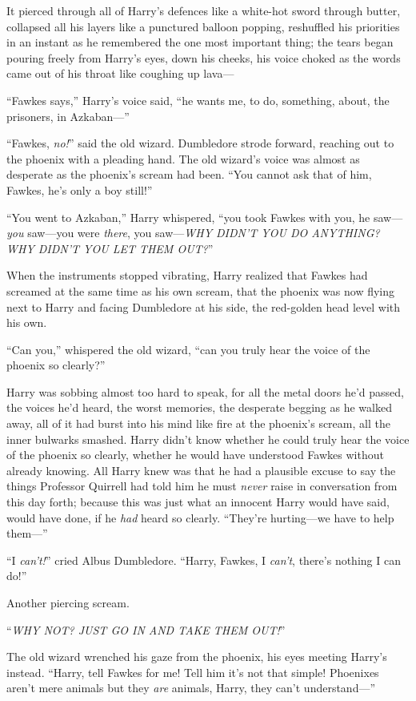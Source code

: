 It pierced through all of Harry’s defences like a white-hot sword through butter, collapsed all his layers like a punctured balloon popping, reshuffled his priorities in an instant as he remembered the one most important thing; the tears began pouring freely from Harry’s eyes, down his cheeks, his voice choked as the words came out of his throat like coughing up lava—

“Fawkes says,” Harry’s voice said, “he wants me, to do, something, about, the prisoners, in Azkaban—”

“Fawkes, \emph{no!}” said the old wizard. Dumbledore strode forward, reaching out to the phoenix with a pleading hand. The old wizard’s voice was almost as desperate as the phoenix’s scream had been. “You cannot ask that of him, Fawkes, he’s only a boy still!”

“You went to Azkaban,” Harry whispered, “you took Fawkes with you, he saw—\emph{you} saw—you were \emph{there}, you saw—\emph{WHY DIDN’T YOU DO ANYTHING? WHY DIDN’T YOU LET THEM OUT?}”

When the instruments stopped vibrating, Harry realized that Fawkes had screamed at the same time as his own scream, that the phoenix was now flying next to Harry and facing Dumbledore at his side, the red-golden head level with his own.

“Can you,” whispered the old wizard, “can you truly hear the voice of the phoenix so clearly?”

Harry was sobbing almost too hard to speak, for all the metal doors he’d passed, the voices he’d heard, the worst memories, the desperate begging as he walked away, all of it had burst into his mind like fire at the phoenix’s scream, all the inner bulwarks smashed. Harry didn’t know whether he could truly hear the voice of the phoenix so clearly, whether he would have understood Fawkes without already knowing. All Harry knew was that he had a plausible excuse to say the things Professor Quirrell had told him he must \emph{never} raise in conversation from this day forth; because this was just what an innocent Harry would have said, would have done, if he \emph{had} heard so clearly. “They’re hurting—we have to help them—”

“I \emph{can’t!}” cried Albus Dumbledore. “Harry, Fawkes, I \emph{can’t}, there’s nothing I can do!”

Another piercing scream.

“\emph{WHY NOT? JUST GO IN AND TAKE THEM OUT!}”

The old wizard wrenched his gaze from the phoenix, his eyes meeting Harry’s instead. “Harry, tell Fawkes for me! Tell him it’s not that simple! Phoenixes aren’t mere animals but they \emph{are} animals, Harry, they can’t understand—”

